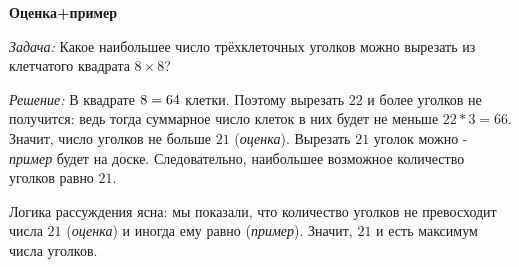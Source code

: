\documentclass{article}
\begin{document}
\large
	
	
	\begin{center}
		\textbf{Оценка+пример}
	\end{center}
	
	\textit{Задача:} Какое наибольшее число трёхклеточных уголков можно вырезать из клетчатого квадрата $8 \times 8$?
	
	\textit{Решение:} В квадрате $8 \time 8=64$ клетки. Поэтому вырезать $22$ и более уголков не получится: ведь тогда суммарное число клеток в них будет не меньше $22*3 = 66$. Значит, число уголков не больше $21$ (\textit{оценка}).
	Вырезать $21$ уголок можно - \textit{пример} будет на доске. Следовательно, наибольшее возможное количество уголков равно $21$.
	
	Логика рассуждения ясна: мы показали, что количество уголков не превосходит числа $21$
	(\textit{оценка}) и иногда ему равно (\textit{пример}). Значит, $21$ и есть максимум числа уголков.
	
\end{document}
